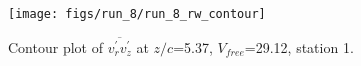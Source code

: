 \begin{figure}[H]
\centering
\texttt{[image: figs/run\_8/run\_8\_rw\_contour]}
\caption{Contour plot of $\overline{v_{r}^{\prime} v_{z}^{\prime}}$ at $z/c$=5.37, $V_{free}$=29.12, station 1.}
\label{fig:run_8_rw_contour}
\end{figure}



